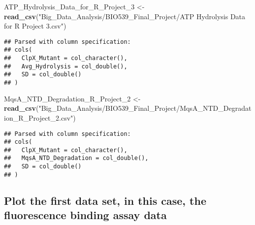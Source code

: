 \documentclass[]{article}
\newenvironment{Shaded}{\begin{snugshade}}{\end{snugshade}}
\newcommand{\DecValTok}[1]{\textcolor[rgb]{0.00,0.00,0.81}{#1}}
\newcommand{\KeywordTok}[1]{\textcolor[rgb]{0.13,0.29,0.53}{\textbf{#1}}}
\newcommand{\NormalTok}[1]{#1}
\newcommand{\StringTok}[1]{\textcolor[rgb]{0.31,0.60,0.02}{#1}}
\begin{document}
\begin{Shaded}
\begin{Highlighting}[]
\NormalTok{ATP_Hydrolysis_Data_for_R_Project_}\DecValTok{3}\NormalTok{ <-}\StringTok{ }\KeywordTok{read_csv}\NormalTok{(}\StringTok{"Big_Data_Analysis/BIO539_Final_Project/ATP Hydrolysis Data for R Project 3.csv"}\NormalTok{)}
\end{Highlighting}
\end{Shaded}

\begin{verbatim}
## Parsed with column specification:
## cols(
##   ClpX_Mutant = col_character(),
##   Avg_Hydrolysis = col_double(),
##   SD = col_double()
## )
\end{verbatim}

\begin{Shaded}
\begin{Highlighting}[]
\NormalTok{MqsA_NTD_Degradation_R_Project_}\DecValTok{2}\NormalTok{ <-}\StringTok{ }\KeywordTok{read_csv}\NormalTok{(}\StringTok{"Big_Data_Analysis/BIO539_Final_Project/MqsA_NTD_Degradation_R_Project_2.csv"}\NormalTok{)}
\end{Highlighting}
\end{Shaded}

\begin{verbatim}
## Parsed with column specification:
## cols(
##   ClpX_Mutant = col_character(),
##   MqsA_NTD_Degradation = col_double(),
##   SD = col_double()
## )
\end{verbatim}

\hypertarget{plot-the-first-data-set-in-this-case-the-fluorescence-binding-assay-data}{%
\subsection{Plot the first data set, in this case, the fluorescence
binding assay
data}\label{plot-the-first-data-set-in-this-case-the-fluorescence-binding-assay-data}}
\end{document}
